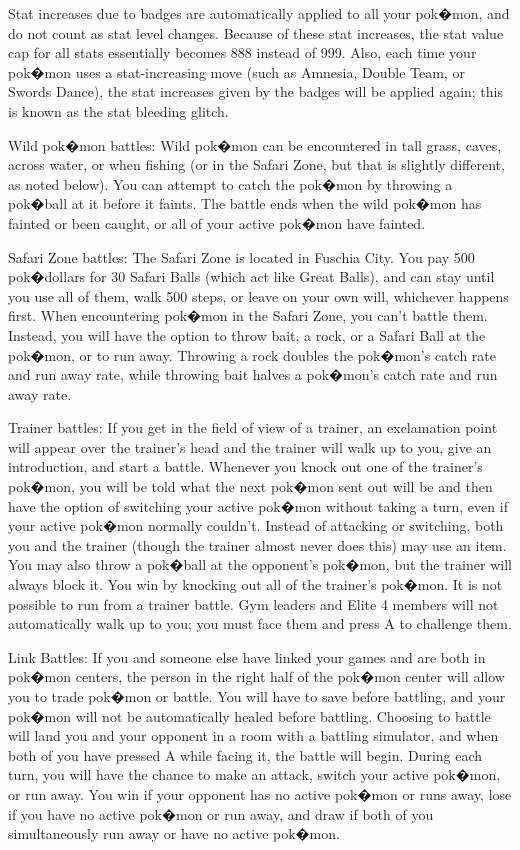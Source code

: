 \documentclass[reprint, aps, prl, paper=A4]{revtex4-1}
\begin{document}
Stat increases due to badges are automatically applied to all your pok�mon, and do not
count as stat level changes. Because of these stat increases, the stat value cap for all stats
essentially becomes 888 instead of 999. Also, each time your pok�mon uses a stat-increasing
move (such as Amnesia, Double Team, or Swords Dance), the stat increases given by the badges
will be applied again; this is known as the stat bleeding glitch.


Wild pok�mon battles:
Wild pok�mon can be encountered in tall grass, caves, across water, or when fishing (or in the
Safari Zone, but that is slightly different, as noted below). You can attempt to catch the
pok�mon by throwing a pok�ball at it before it faints. The battle ends when the wild pok�mon
has fainted or been caught, or all of your active pok�mon have fainted.


Safari Zone battles:
The Safari Zone is located in Fuschia City. You pay 500 pok�dollars for 30 Safari Balls (which
act like Great Balls), and can stay until you use all of them, walk 500 steps, or leave on your
own will, whichever happens first. When encountering pok�mon in the Safari Zone, you can't
battle them. Instead, you will have the option to throw bait, a rock, or a Safari Ball at the
pok�mon, or to run away. Throwing a rock doubles the pok�mon's catch rate and run away rate,
while throwing bait halves a pok�mon's catch rate and run away rate.


Trainer battles:
If you get in the field of view of a trainer, an exclamation point will appear over the
trainer's head and the trainer will walk up to you, give an introduction, and start a battle.
Whenever you knock out one of the trainer's pok�mon, you will be told what the next pok�mon
sent out will be and then have the option of switching your active pok�mon without taking a
turn, even if your active pok�mon normally couldn't. Instead of attacking or switching, both
you and the trainer (though the trainer almost never does this) may use an item. You may also
throw a pok�ball at the opponent's pok�mon, but the trainer will always block it. You win by
knocking out all of the trainer's pok�mon. It is not possible to run from a trainer battle. Gym
leaders and Elite 4 members will not automatically walk up to you; you must face them and press
A to challenge them.


Link Battles:
If you and someone else have linked your games and are both in pok�mon centers, the person in
the right half of the pok�mon center will allow you to trade pok�mon or battle. You will have
to save before battling, and your pok�mon will not be automatically healed before battling.
Choosing to battle will land you and your opponent in a room with a battling simulator, and
when both of you have pressed A while facing it, the battle will begin. During each turn, you
will have the chance to make an attack, switch your active pok�mon, or run away. You win if
your opponent has no active pok�mon or runs away, lose if you have no active pok�mon or run
away, and draw if both of you simultaneously run away or have no active pok�mon.
\end{document}
